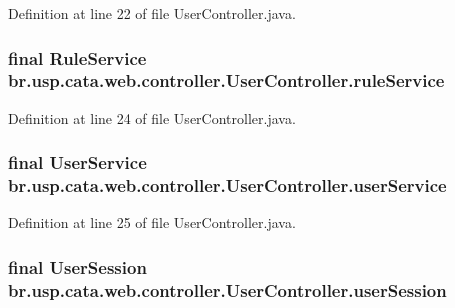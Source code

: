 Definition at line 22 of file User\+Controller.\+java.

\hypertarget{classbr_1_1usp_1_1cata_1_1web_1_1controller_1_1_user_controller_ab72b00bd805ff0677b29f27f95247eb1}{
\subsubsection[{rule\+Service}]{\setlength{\rightskip}{0pt plus 5cm}final {\bf Rule\+Service} br.\+usp.\+cata.\+web.\+controller.\+User\+Controller.\+rule\+Service\hspace{0.3cm}{\ttfamily [private]}}}\label{classbr_1_1usp_1_1cata_1_1web_1_1controller_1_1_user_controller_ab72b00bd805ff0677b29f27f95247eb1}


Definition at line 24 of file User\+Controller.\+java.

\hypertarget{classbr_1_1usp_1_1cata_1_1web_1_1controller_1_1_user_controller_a315d5cc2b3e9a566e316236c98ca624a}{
\subsubsection[{user\+Service}]{\setlength{\rightskip}{0pt plus 5cm}final {\bf User\+Service} br.\+usp.\+cata.\+web.\+controller.\+User\+Controller.\+user\+Service\hspace{0.3cm}{\ttfamily [private]}}}\label{classbr_1_1usp_1_1cata_1_1web_1_1controller_1_1_user_controller_a315d5cc2b3e9a566e316236c98ca624a}


Definition at line 25 of file User\+Controller.\+java.

\hypertarget{classbr_1_1usp_1_1cata_1_1web_1_1controller_1_1_user_controller_a64ae05ca5e96c92199052ac263d25a00}{
\subsubsection[{user\+Session}]{\setlength{\rightskip}{0pt plus 5cm}final {\bf User\+Session} br.\+usp.\+cata.\+web.\+controller.\+User\+Controller.\+user\+Session\hspace{0.3cm}{\ttfamily [private]}}}\label{classbr_1_1usp_1_1cata_1_1web_1_1controller_1_1_user_controller_a64ae05ca5e96c92199052ac263d25a00}


